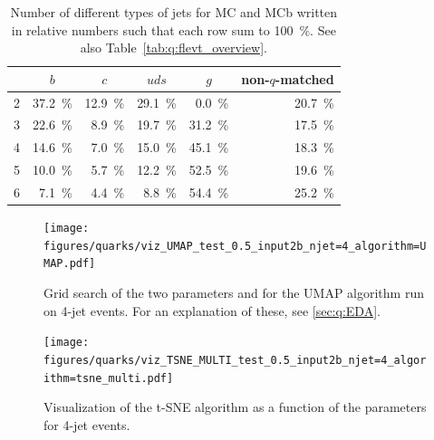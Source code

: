 
\begin{table}
  \centering
  \begin{tabular}{@{}rrrrrr@{}}
    {}    & \multicolumn{1}{c}{$b$} & \multicolumn{1}{c}{$c$} & \multicolumn{1}{c}{$uds$} & \multicolumn{1}{c}{$g$} & non-$q$-matched     \\ 
    \midrule
    2 & \SI{37.2}{\percent}  & \SI{12.9}{\percent}  & \SI{29.1}{\percent} &  \SI{0.0}{\percent} & \SI{20.7}{\percent}  \\
    3 & \SI{22.6}{\percent}  &  \SI{8.9}{\percent}  & \SI{19.7}{\percent} & \SI{31.2}{\percent} & \SI{17.5}{\percent}  \\
    4 & \SI{14.6}{\percent}  &  \SI{7.0}{\percent}  & \SI{15.0}{\percent} & \SI{45.1}{\percent} & \SI{18.3}{\percent}  \\
    5 & \SI{10.0}{\percent}  &  \SI{5.7}{\percent}  & \SI{12.2}{\percent} & \SI{52.5}{\percent} & \SI{19.6}{\percent}  \\
    6 &  \SI{7.1}{\percent}  &  \SI{4.4}{\percent}  &  \SI{8.8}{\percent} & \SI{54.4}{\percent} & \SI{25.2}{\percent}  \\
  \end{tabular}
  \caption{Number of different types of jets for MC and MCb written in relative numbers such that each row sum to \SI{100}{\percent}. See also Table~\ref{tab:q:flevt_overview}.}
  \label{tab:q:flevt_overview_percent_relative}
\end{table}


\newpage
\begin{figure}[h!]
  \centerfloat
  \texttt{[image: figures/quarks/viz\_UMAP\_test\_0.5\_input2b\_njet=4\_algorithm=UMAP.pdf]}
  \caption[UMAP Parameter Grid Search]
          {Grid search of the two parameters  and  for the UMAP algorithm run on 4-jet events. For an explanation of these, see \autoref{sec:q:EDA}.} 
  \label{fig:q:UMAP_vertex_all_4j}
\end{figure}

\vspace{2cm}

\begin{figure}[h!]
  \centerfloat
  \texttt{[image: figures/quarks/viz\_TSNE\_MULTI\_test\_0.5\_input2b\_njet=4\_algorithm=tsne\_multi.pdf]}
  \caption[Visualization of the t-SNE algorithm]
          {Visualization of the t-SNE algorithm as a function of the  parameters for 4-jet events.} 
  \label{fig:q:tsne_vertex}
\end{figure}

